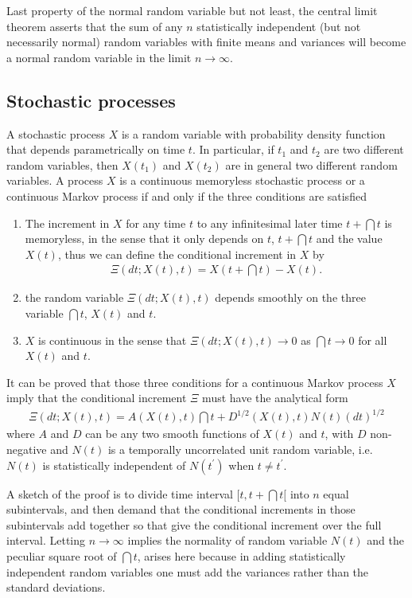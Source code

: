 \documentclass[10pt,a4paper]{article}
\begin{document}
Last property of the normal random variable but not least, the central limit
theorem asserts that the sum of any $n$ statistically independent (but not
necessarily normal) random variables with finite means and variances will
become a normal random variable in the limit $n\rightarrow\infty$.

\subsection{Stochastic processes}
\label{sub:stocproc}

A stochastic process $X$ is a random variable with probability density
function that depends parametrically on time $t$. In particular, if $t_1$
and $t_2$ are two different random variables, then $X(t_1)$ and $X(t_2)$ are
in general two different random variables. 
A process $X$ is  a continuous memoryless stochastic process or a continuous
Markov process if and only if the three conditions are satisfied
\begin{enumerate}
\item The increment in $X$ for any time $t$ to any infinitesimal later time
$t{+}\dint{t}$ is memoryless, in the sense that it only depends on $t$,
$t{+}\dint{t}$ and the value $X(t)$, thus we can define the conditional
increment in $X$ by
\begin{align}
\Xi(dt;X(t),t) = X(t{+}\dint{t})-X(t).
\end{align}
\item the random variable $\Xi(dt;X(t),t)$ depends smoothly  on the three
variable $\dint{t}$, $X(t)$ and $t$. 
\item $X$ is continuous in the sense that $\Xi(dt;X(t),t)\rightarrow0$ as 
$\dint{t}\rightarrow0$ for all $X(t)$ and $t$.
\end{enumerate}

It can be proved \citep{gillespie:1996a} that those three conditions for a
continuous Markov process $X$ imply that the conditional increment $\Xi$ must
have the analytical form
\begin{align}
\Xi(dt;X(t),t) = A(X(t),t)\dint{t}+D^{1/2}(X(t),t)N(t)(dt)^{1/2}
\end{align}
where $A$ and $D$ can be any two smooth functions of $X(t)$ and $t$, with
$D$ non-negative and $N(t)$ is a temporally uncorrelated unit random
variable, i.e.\ $N(t)$ is statistically independent of $N(t^\prime)$ when
$t\neq t^\prime$.

A sketch of the proof is to divide time interval $[t,t{+}\dint{t}[$ into $n$
equal subintervals, and then demand that the conditional increments in those
subintervals add together so that give the conditional increment over the full
interval.
Letting $n\rightarrow\infty$ implies the normality of random variable $N(t)$
and the peculiar square root of $\dint{t}$, arises here because in adding
statistically independent random variables one must add the variances rather
than the standard deviations. 
\end{document}
